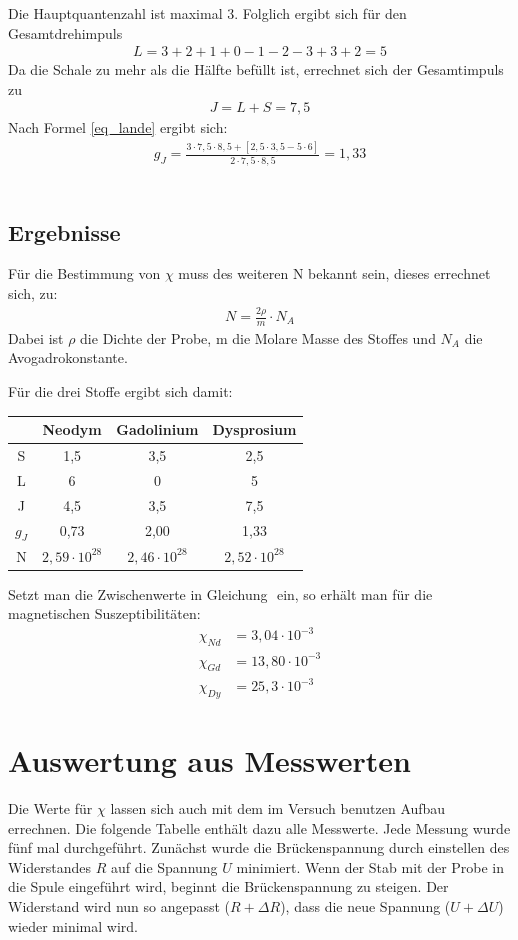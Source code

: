 Die Hauptquantenzahl ist maximal 3. Folglich ergibt sich für den Gesamtdrehimpuls
\begin{align*}
L= 3+2+1+0-1-2-3+3+2=5
\end{align*} 
Da die Schale zu mehr als die Hälfte befüllt ist, errechnet sich der Gesamtimpuls zu 
\begin{align*}
J=L+S=7,5
\end{align*}
Nach Formel \eqref{eq_lande} ergibt sich:
\begin{align}
g_J=\frac{3\cdot7,5\cdot8,5+[2,5\cdot3,5-5\cdot6]}{2\cdot 7,5\cdot8,5}=1,33
\end{align}\\

\subsection{Ergebnisse}
Für die Bestimmung von $\chi$ muss des weiteren N bekannt sein, dieses errechnet sich, zu:
\begin{align}
N=\frac{2\rho}{m}\cdot N_A
\end{align}
Dabei ist $\rho$ die Dichte der Probe, m die Molare Masse des Stoffes und $N_A$ die Avogadrokonstante.

Für die drei Stoffe ergibt sich damit:

\begin{table}[H]
\begin{tabular}{c|c|c|c|}
   & Neodym & Gadolinium & Dysprosium\\ \hline
  S& 1,5 & 3,5 & 2,5 \\ \hline
  L& 6   & 0   & 5   \\ \hline
  J& 4,5 & 3,5 & 7,5 \\ \hline
  $g_J$& 0,73 & 2,00 & 1,33 \\ \hline
N & $2,59\cdot10^{28}$ & $2,46 \cdot10^{28}$ & $2,52\cdot10^{28}$\\ \hline
\end{tabular}
\end{table}

Setzt man die Zwischenwerte in Gleichung $ $ ein, so erhält man für die magnetischen Suszeptibilitäten:
\begin{align*}
\chi_{Nd}&=3,04\cdot10^{-3}\\
\chi_{Gd}&=13,80\cdot10^{-3}\\
\chi_{Dy}&=25,3\cdot10^{-3}
\end{align*}

\section{Auswertung aus Messwerten}
Die Werte für $\chi$ lassen sich auch mit dem im Versuch benutzen Aufbau errechnen. Die folgende Tabelle enthält dazu alle Messwerte. Jede Messung wurde fünf mal durchgeführt. Zunächst wurde die Brückenspannung durch einstellen des Widerstandes $R$ auf die Spannung $U$ minimiert. Wenn der Stab mit der Probe in die Spule eingeführt wird, beginnt die Brückenspannung zu steigen. Der Widerstand wird nun so angepasst ($R + \Delta R$), dass die neue Spannung ($U + \Delta U$) wieder minimal wird.

